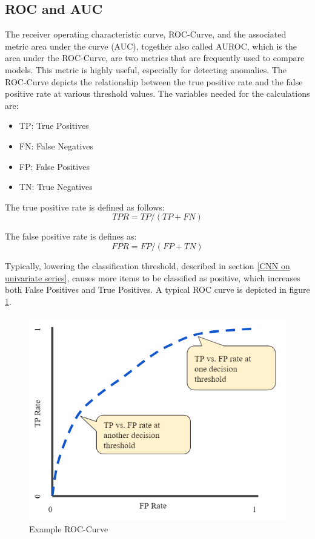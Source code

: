 \subsection{ROC and AUC} \label{AUROC}

The receiver operating characteristic curve, ROC-Curve, and the associated metric area under the curve (AUC), together also called AUROC, which is the area under the ROC-Curve, are two metrics that are frequently used to compare models. This metric is highly useful, especially for detecting anomalies. The ROC-Curve depicts the relationship between the true positive rate and the false positive rate at various threshold values. The variables needed for the calculations are:

\begin{itemize}
	\item TP: True Positives
	\item FN: False Negatives
	\item FP: False Positives
	\item TN: True Negatives	 
\end{itemize}

	
	The true positive rate is defined as follows: \[TPR = TP/(TP+FN)\]
	
	The false positive rate is defines as: \[FPR = FP/(FP+TN)\]

Typically, lowering the classification threshold, described in section \ref{CNN on univariate series}, causes more items to be classified as positive, which increases both False Positives and True Positives. A typical ROC curve is depicted in figure \ref{fig:ROC}.

\begin{figure}[h]
	\centering
	\includegraphics[scale=00.4]{Figures/ROC}
	\decoRule
	\caption[Example ROC-Curve]{Example ROC-Curve \parencite{Google2020}}
	\label{fig:ROC}
\end{figure}


